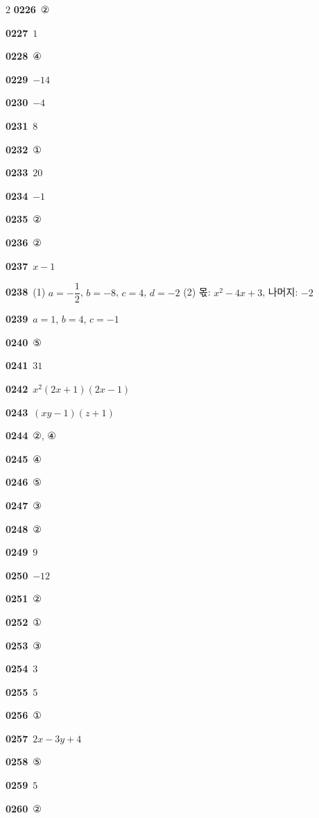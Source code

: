 \documentclass[10pt,a4paper]{article}
\begin{document}
\begin{multicols}{2}
\noindent\textbf{0226}\ ②\par
\noindent\textbf{0227}\ $1$\par
\noindent\textbf{0228}\ ④\par
\noindent\textbf{0229}\ $-14$\par
\noindent\textbf{0230}\ $-4$\par
\noindent\textbf{0231}\ $8$\par
\noindent\textbf{0232}\ ①\par
\noindent\textbf{0233}\ $20$\par
\noindent\textbf{0234}\ $-1$\par
\noindent\textbf{0235}\ ②\par
\noindent\textbf{0236}\ ②\par
\noindent\textbf{0237}\ $x-1$\par
\noindent\textbf{0238}\ (1) $a=-\dfrac{1}{2}$, $b=-8$, $c=4$, $d=-2$ (2) 몫: $x^2-4x+3$, 나머지: $-2$\par
\noindent\textbf{0239}\ $a=1$, $b=4$, $c=-1$\par
\noindent\textbf{0240}\ ⑤\par
\noindent\textbf{0241}\ $31$\par
\noindent\textbf{0242}\ $x^2(2x+1)(2x-1)$\par
\noindent\textbf{0243}\ $(xy-1)(z+1)$\par
\noindent\textbf{0244}\ ②, ④\par
\noindent\textbf{0245}\ ④\par
\noindent\textbf{0246}\ ⑤\par
\noindent\textbf{0247}\ ③\par
\noindent\textbf{0248}\ ②\par
\noindent\textbf{0249}\ $9$\par
\noindent\textbf{0250}\ $-12$\par
\noindent\textbf{0251}\ ②\par
\noindent\textbf{0252}\ ①\par
\noindent\textbf{0253}\ ③\par
\noindent\textbf{0254}\ $3$\par
\noindent\textbf{0255}\ $5$\par
\noindent\textbf{0256}\ ①\par
\noindent\textbf{0257}\ $2x-3y+4$\par
\noindent\textbf{0258}\ ⑤\par
\noindent\textbf{0259}\ $5$\par
\noindent\textbf{0260}\ ②\par

\end{multicols}
\end{document}
